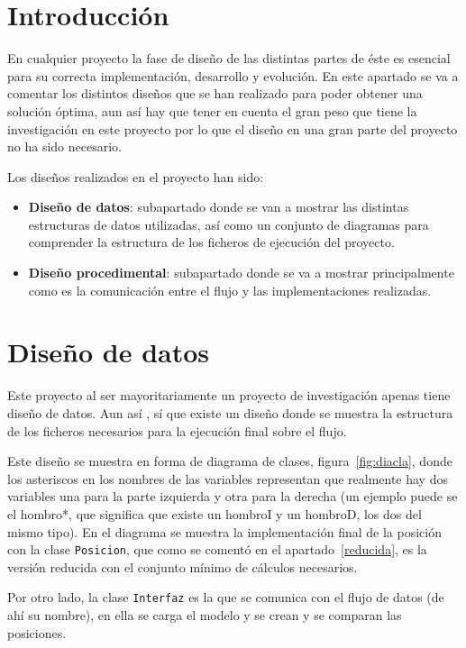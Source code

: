
\section{Introducción}
En cualquier proyecto la fase de diseño de las distintas partes de éste es esencial para su correcta implementación, desarrollo y evolución. En este apartado se va a comentar los distintos diseños que se han realizado para poder obtener una solución óptima, aun así hay que tener en cuenta el gran peso que tiene la investigación en este proyecto por lo que el diseño en una gran parte del proyecto no ha sido necesario.

Los diseños realizados en el proyecto han sido:
\begin{itemize}
	\item \textbf{Diseño de datos}: subapartado donde se van a mostrar las distintas estructuras de datos utilizadas, así como un conjunto de diagramas para comprender la estructura de los ficheros de ejecución del proyecto.
	\item \textbf{Diseño procedimental}: subapartado donde se va a mostrar principalmente como es la comunicación entre el flujo y las implementaciones realizadas.
\end{itemize}
\section{Diseño de datos}

Este proyecto al ser mayoritariamente un proyecto de investigación apenas tiene diseño de datos. Aun así , sí que existe un diseño donde se muestra la estructura de los ficheros necesarios para la ejecución final sobre el flujo.

Este diseño se muestra en forma de diagrama de clases, figura~\ref{fig:diacla}, donde los asteriscos en los nombres de las variables representan que realmente hay dos variables una para la parte izquierda y otra para la derecha (un ejemplo puede se el hombro*, que significa que existe un hombroI y un hombroD, los dos del mismo tipo). En el diagrama se muestra la implementación final de la posición con la clase \texttt{Posicion}, que como se comentó en el apartado~\ref{reducida}, es la versión reducida con el conjunto mínimo de cálculos necesarios.

Por otro lado, la clase \texttt{Interfaz} es la que se comunica con el flujo de datos (de ahí su nombre), en ella se carga el modelo y se crean y se comparan las posiciones.

